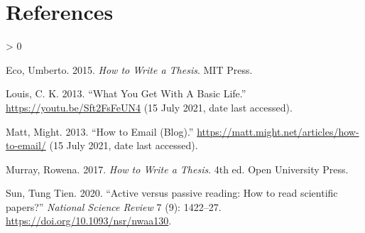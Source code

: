 \documentclass[
  12pt,
  oneside]{book}
\newlength{\cslhangindent}
\newenvironment{CSLReferences}[2] %
 {%
  \setlength{\parindent}{0pt}
  \ifodd #1 \everypar{\setlength{\hangindent}{\cslhangindent}}\ignorespaces\fi
  \ifnum #2 > 0
  \setlength{\parskip}{#2\baselineskip}
  \fi
 }%
 {}
\begin{document}
\hypertarget{references}{%
\chapter*{References}\label{references}}

\hypertarget{refs}{}
\begin{CSLReferences}{1}{0}
\leavevmode\hypertarget{ref-Eco2015}{}%
Eco, Umberto. 2015. \emph{{How to Write a Thesis}}. MIT Press.

\leavevmode\hypertarget{ref-BasicCable-LCK}{}%
Louis, C. K. 2013. {``{What You Get With A Basic Life}.''} \url{https://youtu.be/Sft2FsFeUN4} (15 July 2021, date last accessed).

\leavevmode\hypertarget{ref-email-MattMight}{}%
Matt, Might. 2013. {``{How to Email (Blog)}.''} \url{https://matt.might.net/articles/how-to-email/} (15 July 2021, date last accessed).

\leavevmode\hypertarget{ref-Murray2017}{}%
Murray, Rowena. 2017. \emph{{How to Write a Thesis}}. 4th ed. Open University Press.

\leavevmode\hypertarget{ref-Sun2020}{}%
Sun, Tung Tien. 2020. {``{Active versus passive reading: How to read scientific papers?}''} \emph{National Science Review} 7 (9): 1422--27. \url{https://doi.org/10.1093/nsr/nwaa130}.

\end{CSLReferences}
\end{document}
